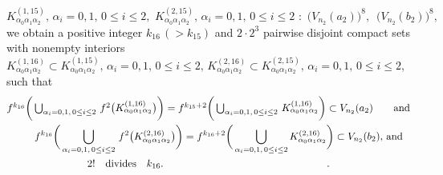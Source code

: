 \documentclass[12pt]{article}
\newcommand{\al}{\alpha}
\begin{document}
$$
K_{\al_0\al_1\al_2}^{(1,15)}, \, \al_i = 0, 1, \, 0 \le i \le 2, \,\, K_{\al_0\al_1\al_2}^{(2,15)}, \, \al_i = 0, 1, \, 0 \le i \le 2 \,\, : \,\, \big(V_{n_2}(a_2)\big)^8, \,\,\, \big(V_{n_2}(b_2)\big)^8,
$$
we obtain a positive integer $k_{16} \, (> k_{15})$ and $2 \cdot 2^3$ pairwise disjoint compact sets with nonempty interiors $K_{\al_0\al_1\al_2}^{(1,16)} \subset K_{\al_0\al_1\al_2}^{(1,15)}, \, \al_i = 0, 1, \, 0 \le i \le 2, \, K_{\al_0\al_1\al_2}^{(2,16)} \subset K_{\al_0\al_1\al_2}^{(2,15)}, \, \al_i = 0, 1, \, 0 \le i \le 2$, such that 
\begin{multline*}
$$
f^{k_{16}}\bigg(\bigcup_{\al_i = 0, 1, \, 0 \le i \le 2} \, f^2\big(K_{\al_0\al_1\al_2}^{(1,16)}\big)\bigg) = f^{k_{15}+2}\bigg(\bigcup_{\al_i = 0, 1, \, 0 \le i \le 2} \, K_{\al_0\al_1\al_2}^{(1,16)}\bigg) \subset V_{n_2}(a_2) \qquad \text{and} \\
\qquad f^{k_{16}}\bigg(\bigcup_{\al_i = 0, 1, \, 0 \le i \le 2} \, f^2\big(K_{\al_0\al_1\al_2}^{(2,16)}\big)\bigg) = f^{k_{16}+2}\bigg(\bigcup_{\al_i = 0, 1, \, 0 \le i \le 2} K_{\al_0\al_1\al_2}^{(2,16)}\bigg) \subset V_{n_2}(b_2), \, \text{and} \\
2! \quad \text{divides} \quad k_{16}. \qquad\qquad\qquad\qquad\qquad\qquad\qquad\qquad.
$$
\end{multline*}
\end{document}
